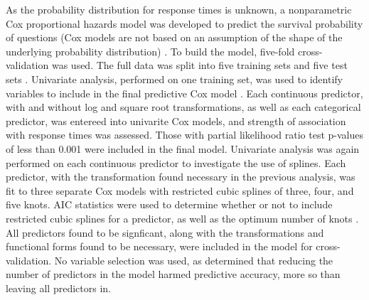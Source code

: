 \documentclass{article}
\begin{document}
As the probability distribution for response times is unknown, a nonparametric Cox proportional hazards model was developed to predict the survival probability of questions (Cox models are not based on an assumption of the shape of the underlying probability distribution) \cite{Moore2010}. To build the model, five-fold cross-validation was used. The full data was split into five training sets and five test sets \cite{Rodriguez2010}. Univariate analysis, performed on one training set, was used to identify variables to include in the final predictive Cox model \cite{Hammermeister1979}. Each continuous predictor, with and without log and square root transformations, as well as each categorical predictor, was entereed into univarite Cox models, and strength of association with response times was assessed. Those with partial likelihood ratio test p-values of less than 0.001 were included in the final model. Univariate analysis was again performed on each continuous predictor to investigate the use of splines. Each predictor, with the transformation found necessary in the previous analysis, was fit to three separate Cox models with restricted cubic splines of three, four, and five knots. AIC statistics were used to determine whether or not to include restricted cubic splines for a predictor, as well as the optimum number of knots \cite{Harrell2015}. All predictors found to be signficant, along with the transformations and functional forms found to be necessary, were included in the model for cross-validation. No variable selection was used, as \cite{Harrell2015} determined that reducing the number of predictors in the model harmed predictive accuracy, more so than leaving all predictors in. 
\end{document}
